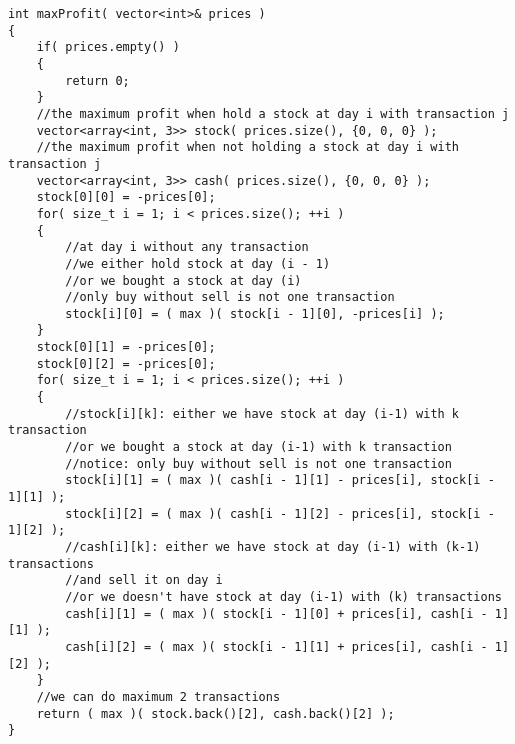 \setcounter{lstlisting}{0}
\begin{lstlisting}[style=customc, caption={DP}]
int maxProfit( vector<int>& prices )
{
    if( prices.empty() )
    {
        return 0;
    }
    //the maximum profit when hold a stock at day i with transaction j
    vector<array<int, 3>> stock( prices.size(), {0, 0, 0} );
    //the maximum profit when not holding a stock at day i with transaction j
    vector<array<int, 3>> cash( prices.size(), {0, 0, 0} );
    stock[0][0] = -prices[0];
    for( size_t i = 1; i < prices.size(); ++i )
    {
        //at day i without any transaction
        //we either hold stock at day (i - 1)
        //or we bought a stock at day (i)
        //only buy without sell is not one transaction
        stock[i][0] = ( max )( stock[i - 1][0], -prices[i] );
    }
    stock[0][1] = -prices[0];
    stock[0][2] = -prices[0];
    for( size_t i = 1; i < prices.size(); ++i )
    {
        //stock[i][k]: either we have stock at day (i-1) with k transaction
        //or we bought a stock at day (i-1) with k transaction
        //notice: only buy without sell is not one transaction
        stock[i][1] = ( max )( cash[i - 1][1] - prices[i], stock[i - 1][1] );
        stock[i][2] = ( max )( cash[i - 1][2] - prices[i], stock[i - 1][2] );
        //cash[i][k]: either we have stock at day (i-1) with (k-1) transactions
        //and sell it on day i
        //or we doesn't have stock at day (i-1) with (k) transactions
        cash[i][1] = ( max )( stock[i - 1][0] + prices[i], cash[i - 1][1] );
        cash[i][2] = ( max )( stock[i - 1][1] + prices[i], cash[i - 1][2] );
    }
    //we can do maximum 2 transactions
    return ( max )( stock.back()[2], cash.back()[2] );
}
\end{lstlisting}



